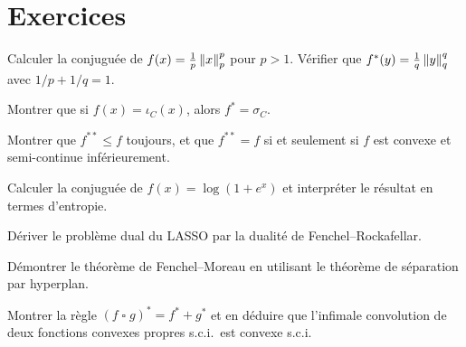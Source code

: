 \section{Exercices}

\begin{exercice}[$\star$]
Calculer la conjugu\'ee de $f(x) = \frac{1}{p}\left\| x \right\|_p^p$ pour $p > 1$.
V\'erifier que $f^*(y) = \frac{1}{q}\left\| y \right\|_q^q$ avec $1/p + 1/q = 1$.
\end{exercice}

\begin{exercice}[$\star$]
Montrer que si $f(x) = \iota_C(x)$, alors $f^* = \sigma_C$.
\end{exercice}

\begin{exercice}[$\star\star$]
Montrer que $f^{**} \leq f$ toujours, et que $f^{**} = f$ si et seulement si $f$
est convexe et semi-continue inf\'erieurement.
\end{exercice}

\begin{exercice}[$\star\star$]
Calculer la conjugu\'ee de $f(x) = \log(1 + e^x)$ et interpr\'eter le r\'esultat
en termes d'entropie.
\end{exercice}

\begin{exercice}[$\star\star$]
D\'eriver le probl\`eme dual du LASSO par la dualit\'e de Fenchel--Rockafellar.
\end{exercice}

\begin{exercice}[$\star\star\star$]
D\'emontrer le th\'eor\`eme de Fenchel--Moreau en utilisant le th\'eor\`eme de
s\'eparation par hyperplan.
\end{exercice}

\begin{exercice}[$\star\star\star$]
Montrer la r\`egle $(f \mathop{\square} g)^* = f^* + g^*$ et en d\'eduire que
l'infimale convolution de deux fonctions convexes propres s.c.i.\ est convexe s.c.i.
\end{exercice}
